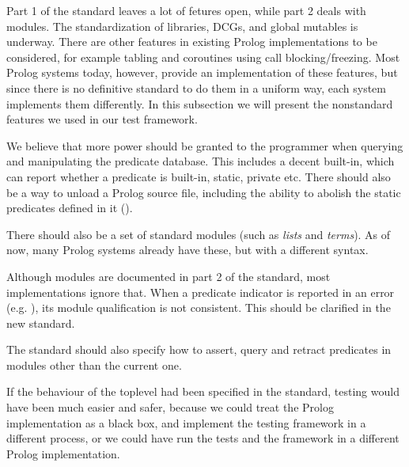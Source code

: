 \documentclass[draft]{llncs}%
\begin{document}
Part 1 of the standard \cite{isoprolog95} leaves a lot of fetures open,
while part 2 deals with modules.  The standardization of libraries,
DCGs, and global mutables is underway. There are other features in existing
Prolog implementations to be considered, for example tabling and coroutines
using call blocking/freezing. Most Prolog systems today, however, provide an
implementation of these features, but since there is no definitive standard
to do them in a uniform way, each system implements them differently. In this
subsection we will present the nonstandard features we used in our test
framework.


We believe that
more power should be granted to the programmer when querying and
manipulating the predicate database. This includes a decent
 built-in, which can report
whether a predicate is built-in, static, private etc. There should also be a
way to unload a Prolog source file, including the ability to
abolish the static predicates defined in it
().

There should also be a set of standard modules
(such as \emph{lists} and \emph{terms}). As of now, many Prolog
systems already have these, but with a different syntax.

Although modules are documented in part 2 of the standard,
most implementations ignore that.
When a predicate indicator is reported in an error
(e.g.  ), its module qualification is not
consistent. This should be clarified in the new standard.

The standard should also specify how to assert, query and retract predicates
in modules other than the current one.

If the behaviour of the toplevel had been specified in the standard, testing
would have been much easier and safer, because we could treat the Prolog
implementation as a black box, and implement the testing framework in a
different process, or we could have run the tests and the framework in a
different Prolog implementation.
\end{document}
